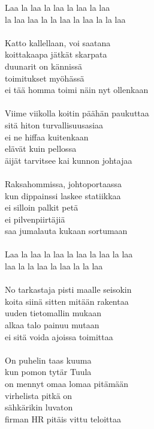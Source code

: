 
Laa la laa la laa la laa la laa \\ la laa laa la la laa la laa la la laa \\ \hspace{10mm} \\ Katto kallellaan, voi saatana \\ koittakaapa jätkät skarpata \\ duunarit on kännissä \\ toimitukset myöhässä \\ ei tää homma toimi näin nyt ollenkaan \\ \hspace{10mm} \\ Viime viikolla koitin päähän paukuttaa \\ sitä hiton turvallisuusasiaa \\ ei ne hiffaa kuitenkaan \\ elävät kuin pellossa \\ äijät tarvitsee kai kunnon johtajaa \\ \hspace{10mm} \\ Raksahommissa, johtoportaassa \\ kun dippainssi laskee statiikkaa \\ ei silloin palkit petä \\ ei pilvenpiirtäjiä \\ saa jumalauta kukaan sortumaan \\ \hspace{10mm} \\ Laa la laa la laa la laa la laa la laa \\ laa la la laa la laa la la laa \\ \hspace{10mm} \\ No tarkastaja pisti maalle seisokin \\ koita siinä sitten mitään rakentaa \\ uuden tietomallin mukaan \\ alkaa talo painuu mutaan \\ ei sitä voida ajoissa toimittaa \\ \hspace{10mm} \\ On puhelin taas kuuma \\ kun pomon tytär Tuula \\ on mennyt omaa lomaa pitämään \\ virhelista pitkä on \\ sähkärikin luvaton \\ firman HR pitäis vittu teloittaa \\ 